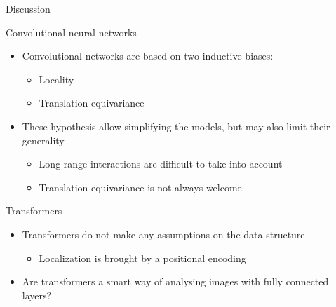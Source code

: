 \documentclass[xcolor=pdftex,dvipsnames,table,mathserif]{beamer}
\begin{document}
\begin{frame}{Discussion}

  \begin{block}{Convolutional neural networks}

    \begin{itemize}[<+->]
    \item Convolutional networks are based on two inductive biases:
      \begin{itemize}
      \item Locality
      \item Translation equivariance
      \end{itemize}

    \item These hypothesis allow simplifying the models, but may also limit their generality

      \begin{itemize}
      \item Long range interactions are difficult to take into account
      \item Translation equivariance is not always welcome

      \end{itemize}
    \end{itemize}

  \end{block}

  \begin{block}{Transformers}

    \begin{itemize}[<+->]
    \item Transformers do not make any assumptions on the data structure
      \begin{itemize}
      \item Localization is brought by a positional encoding
      \end{itemize}

    \item Are transformers a smart way of analysing images with fully connected layers?

    \end{itemize}
  \end{block}


\end{frame}
\end{document}
